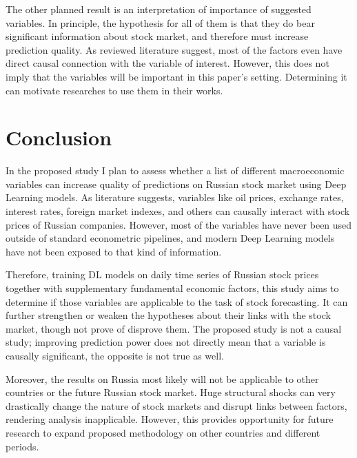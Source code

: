 \documentclass{elsarticle}
\begin{document}
The other planned result is an interpretation of importance of suggested variables. In principle, the hypothesis for all of them is that they do bear significant information about stock market, and therefore must increase prediction quality. As reviewed literature suggest, most of the factors even have direct causal connection with the variable of interest. However, this does not imply that the variables will be important in this paper's setting. Determining it can motivate researches to use them in their works.

\section{Conclusion}

In the proposed study I plan to assess whether a list of different macroeconomic variables can increase quality of predictions on Russian stock market using Deep Learning models. As literature suggests, variables like oil prices, exchange rates, interest rates, foreign market indexes, and others can causally interact with stock prices of Russian companies. However, most of the variables have never been used outside of standard econometric pipelines, and modern Deep Learning models have not been exposed to that kind of information.

Therefore, training DL models on daily time series of Russian stock prices together with supplementary fundamental economic factors, this study aims to determine if those variables are applicable to the task of stock forecasting.
It can further strengthen or weaken the hypotheses about their links with the stock market, though not prove of disprove them. The proposed study is not a causal study; improving prediction power does not directly mean that a variable is causally significant, the opposite is not true as well.

Moreover, the results on Russia most likely will not be applicable to other countries or the future Russian stock market. Huge structural shocks can very drastically change the nature of stock markets and disrupt links between factors, rendering analysis inapplicable. However, this provides opportunity for future research to expand proposed methodology on other countries and different periods.

\printbibliography
\end{document}
